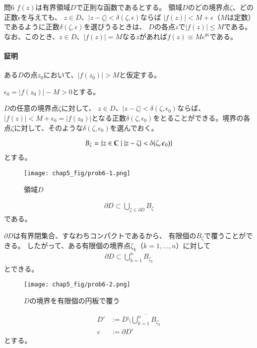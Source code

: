 \begin{mysimplebox}{問6}
    $f(z)$は有界領域$D$で正則な函数であるとする。
    領域$D$のどの境界点$\zeta$、どの正数$\epsilon$を与えても、
    $z\in D$、$|z-\zeta|<\delta(\zeta,\epsilon)$ならば
    $|f(z)|<M+\epsilon$（$M$は定数）であるように正数$\delta(\zeta,\epsilon)$を選びうるときは、
    $D$の各点$z$で$|f(z)|\le M$である。
    なお、このとき、$z\in D$、$|f(z)|=M$なる$z$があれば$f(z)\equiv Me^{\theta i}$である。
\end{mysimplebox}
\paragraph{証明}
ある$D$の点$z_0$において、$|f(z_0)|>M$と仮定する。

$\epsilon_0=|f(z_0)|-M>0$とする。

$D$の任意の境界点$\zeta$に対して、
$z\in D$、$|z-\zeta|<\delta(\zeta,\epsilon_0)$ならば、
$|f(z)|<M+\epsilon_0=|f(z_0)|$となる正数$\delta(\zeta,\epsilon_0)$をとることができる。境界の各点$\zeta$に対して、そのような$\delta(\zeta,\epsilon_0)$を選んでおく。

\begin{align*}
    B_\zeta=\{z\in\mathbb{C}\mid|z-\zeta|<\delta(\zeta,\epsilon_0)\}
\end{align*}
とする。

\begin{figure}[h]
    \centering
    \texttt{[image: chap5\_fig/prob6-1.png]}
    \caption{領域$D$}
    \label{fig:chap5-6-1}
\end{figure}

\begin{align*}
    \partial D\subset\bigcup_{\zeta\in\partial D}B_\zeta
\end{align*}
である。

$\partial D$は有界閉集合、すなわちコンパクトであるから、
有限個の$B_\zeta$で覆うことができる。
したがって、ある有限個の境界点$\zeta_k$（$k=1,\dots,n$）に対して
\begin{align*}
    \partial D\subset\bigcup_{k=1}^{n}B_{\zeta_k}
\end{align*}
とできる。

\begin{figure}[h]
    \centering
    \texttt{[image: chap5\_fig/prob6-2.png]}
    \caption{$D$の境界を有限個の円板で覆う}
    \label{fig:chap5-6-2}
\end{figure}

\begin{align*}
    D'&:=D\setminus\overline{\bigcup_{k=1}^{n}B_{\zeta_k}}\\
    c&:=\partial D'
\end{align*}
とする。

